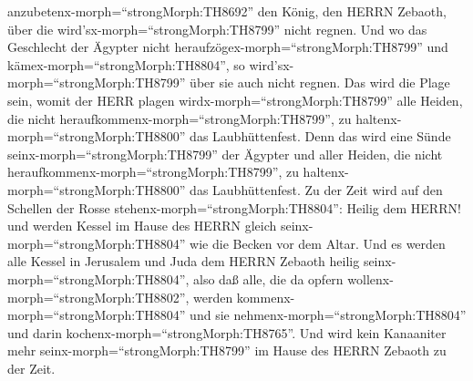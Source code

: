 anzubetenx-morph=``strongMorph:TH8692'' den König, den HERRN Zebaoth,
über die wird'sx-morph=``strongMorph:TH8799'' nicht regnen.
 Und wo das Geschlecht der Ägypter nicht
heraufzögex-morph=``strongMorph:TH8799'' und
kämex-morph=``strongMorph:TH8804'', so
wird'sx-morph=``strongMorph:TH8799'' über sie auch nicht regnen. Das
wird die Plage sein, womit der HERR plagen
wirdx-morph=``strongMorph:TH8799'' alle Heiden, die nicht
heraufkommenx-morph=``strongMorph:TH8799'', zu
haltenx-morph=``strongMorph:TH8800'' das Laubhüttenfest. 
Denn das wird eine Sünde seinx-morph=``strongMorph:TH8799'' der Ägypter
und aller Heiden, die nicht heraufkommenx-morph=``strongMorph:TH8799'',
zu haltenx-morph=``strongMorph:TH8800'' das Laubhüttenfest.
 Zu der Zeit wird auf den Schellen der Rosse
stehenx-morph=``strongMorph:TH8804'': Heilig dem HERRN! und werden
Kessel im Hause des HERRN gleich seinx-morph=``strongMorph:TH8804'' wie
die Becken vor dem Altar.  Und es werden alle Kessel in
Jerusalem und Juda dem HERRN Zebaoth heilig
seinx-morph=``strongMorph:TH8804'', also daß alle, die da opfern
wollenx-morph=``strongMorph:TH8802'', werden
kommenx-morph=``strongMorph:TH8804'' und sie
nehmenx-morph=``strongMorph:TH8804'' und darin
kochenx-morph=``strongMorph:TH8765''. Und wird kein Kanaaniter mehr
seinx-morph=``strongMorph:TH8799'' im Hause des HERRN Zebaoth zu der
Zeit.
